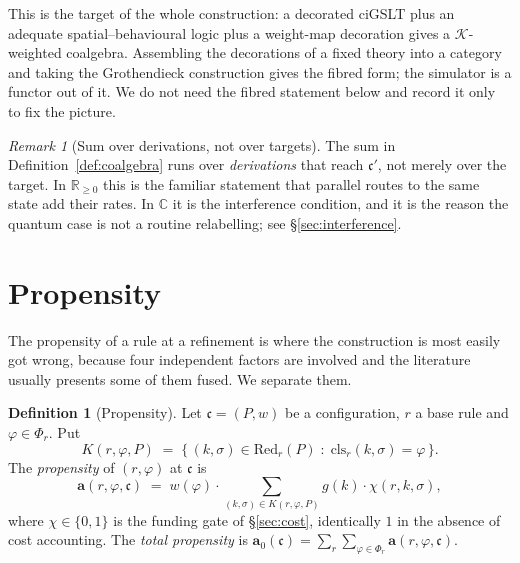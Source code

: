 \documentclass[11pt,a4paper]{article}
\theoremstyle{plain}
\theoremstyle{definition}
\newtheorem{definition}[theorem]{Definition}
\theoremstyle{remark}
\newtheorem{remark}[theorem]{Remark}
\newcommand{\Rnn}{\mathbb{R}_{\geq 0}}
\newcommand{\Cx}{\mathbb{C}}
\newcommand{\Red}{\mathrm{Red}}
\newcommand{\prop}{\mathbf{a}}
\newcommand{\wmap}{w}
\newcommand{\gfac}{g}
\newcommand{\class}{\mathrm{cls}}
\begin{document}
This is the target of the whole construction: a decorated ciGSLT plus an adequate
spatial--behavioural logic plus a weight-map decoration gives a $\mathcal{K}$-weighted coalgebra.
Assembling the decorations of a fixed theory into a category and taking the Grothendieck
construction gives the fibred form; the simulator is a functor out of it. We do not need the fibred
statement below and record it only to fix the picture.

\begin{remark}[Sum over derivations, not over targets]
The sum in Definition~\ref{def:coalgebra} runs over \emph{derivations} that reach $\mathfrak{c}'$,
not merely over the target. In $\Rnn$ this is the familiar statement that parallel routes to the
same state add their rates. In $\Cx$ it is the interference condition, and it is the reason the
quantum case is not a routine relabelling; see \S\ref{sec:interference}.
\end{remark}

\section{Propensity}
\label{sec:propensity}

The propensity of a rule at a refinement is where the construction is most easily got wrong, because
four independent factors are involved and the literature usually presents some of them fused. We
separate them.

\begin{definition}[Propensity]
\label{def:propensity}
Let $\mathfrak{c} = (P, \wmap)$ be a configuration, $r$ a base rule and $\varphi \in \Phi_r$. Put
\[
K(r, \varphi, P) \;=\; \{\, (k,\sigma) \in \Red_r(P) \;:\; \class_r(k,\sigma) = \varphi \,\}.
\]
The \emph{propensity} of $(r,\varphi)$ at $\mathfrak{c}$ is
\[
\prop(r,\varphi,\mathfrak{c})
\;=\;
\wmap(\varphi) \cdot \!\!\sum_{(k,\sigma) \in K(r,\varphi,P)}\!\! \gfac(k)\cdot \chi(r,k,\sigma),
\]
where $\chi \in \{0,1\}$ is the funding gate of \S\ref{sec:cost}, identically $1$ in the absence of
cost accounting. The \emph{total propensity} is
$\prop_0(\mathfrak{c}) = \sum_{r}\sum_{\varphi \in \Phi_r} \prop(r,\varphi,\mathfrak{c})$.
\end{definition}
\end{document}
